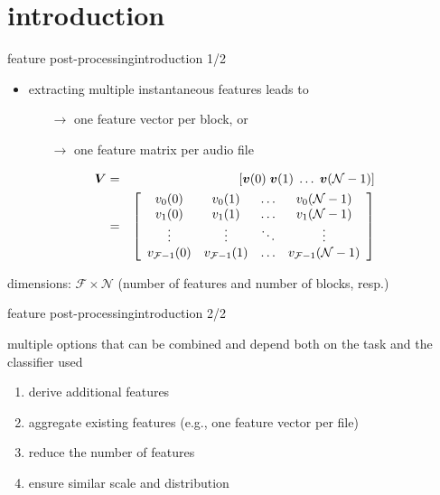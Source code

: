     \section[intro]{introduction}
        \begin{frame}{feature post-processing}{introduction 1/2}
            \begin{itemize}
                \item   extracting multiple instantaneous features leads to 
                    \begin{itemize}
                        \item[$\rightarrow$]   one feature vector per block, or
                        \item[$\rightarrow$]   one feature matrix per audio file
                    \end{itemize}
            \end{itemize}
            \bigskip
			\begin{eqnarray*}
				\mat{V} &=& \left[\vec{v}(0)\; 			\vec{v}(1)\; 				\ldots\;	\vec{v}(\mathcal{N}-1)\right]  \nonumber\\ 
				&=& 				 
						\left[ 
				  			\begin{array}{cccc} 
							v_0(0)					&	v_0(1) 					&	\ldots	&	v_0(\mathcal{N}-1)\\
							v_1(0)					&	v_1(1) 					&	\ldots	&	v_1(\mathcal{N}-1)\\
							\vdots					&	\vdots 					&	\ddots		&	\vdots	\\
							v_{\mathcal{F}-1}(0)	&	v_{\mathcal{F}-1}(1) 	&	\ldots	&	v_{\mathcal{F}-1}(\mathcal{N}-1)\\
							\end{array}  
						\right] 
			\end{eqnarray*}
            
            \bigskip
            \begin{footnotesize}
                dimensions:  $\mathcal{F}\times \mathcal{N}$ (number of features and number of blocks, resp.)
            \end{footnotesize}
        \end{frame}
        
        \begin{frame}{feature post-processing}{introduction 2/2}
            
            multiple options that can be combined and depend both on the task and the classifier used
            \begin{enumerate}   
                \item   derive additional features
                \item   aggregate existing features (e.g., one feature vector per file)
                \item   reduce the number of features
                \item   ensure similar scale and distribution
            \end{enumerate}
        \end{frame}

